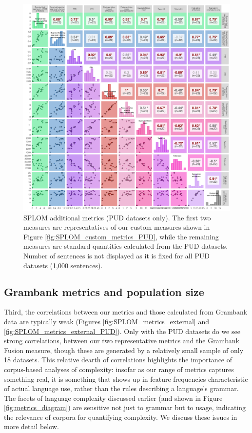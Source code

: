 \documentclass[USenglish]{article}
\begin{document}
\begin{figure}
    \centering
        \includegraphics[width=1\linewidth]{latex/graphics/SPLOM_other_metrics_PUD.png}
    \caption{SPLOM additional metrics (PUD datasets only). The first two measures are representatives of our custom measures shown in Figure \ref{fig:SPLOM_custom_metrics_PUD}, while the remaining measures are standard quantities calculated from the PUD datasets. Number of sentences is not displayed as it is fixed for all PUD datasets (1,000 sentences).}
    \label{fig:SPLOM_other_metrics_PUD}
\end{figure}

\subsection{Grambank metrics and population size}
Third, the correlations between our metrics and those calculated from Grambank data are typically weak (Figures \ref{fig:SPLOM_metrics_external} and \ref{fig:SPLOM_metrics_external_PUD}).
Only with the PUD datasets do we see strong correlations, between our two representative metrics and the Grambank Fusion measure, though these are generated by a relatively small sample of only 18 datasets.
This relative dearth of correlations highlights the importance of corpus-based analyses of complexity: insofar as our range of metrics captures something real, it is something that shows up in feature frequencies characteristic of actual language use, rather than the rules describing a language's grammar.
The facets of language complexity discussed earlier (and shown in Figure \ref{fig:metrics_diagram}) are sensitive not just to grammar but to usage, indicating the relevance of corpora for quantifying complexity.
We discuss these issues in more detail below.
\end{document}
